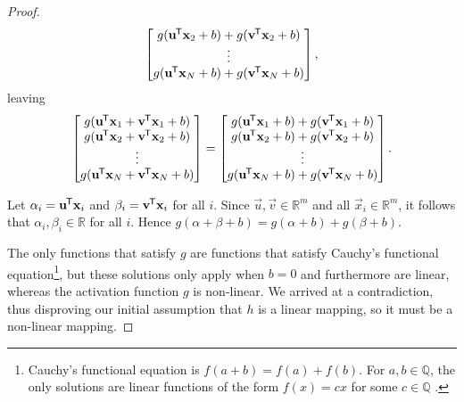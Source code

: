 \begin{proof}
\begin{equation*}
\begin{bmatrix}
            g(\mathbf{u}^{\mkern-1.5mu\mathsf{T}} \mathbf{x}_2 + b) + g(\mathbf{v}^{\mkern-1.5mu\mathsf{T}} \mathbf{x}_2 + b) \\
            \vdots \\
            g(\mathbf{u}^{\mkern-1.5mu\mathsf{T}} \mathbf{x}_N + b) + g(\mathbf{v}^{\mkern-1.5mu\mathsf{T}} \mathbf{x}_N + b) \\
        \end{bmatrix},
    \end{equation*}
    leaving
    \begin{equation*}
        \begin{bmatrix}
            g(\mathbf{u}^{\mkern-1.5mu\mathsf{T}} \mathbf{x}_1 + \mathbf{v}^{\mkern-1.5mu\mathsf{T}} \mathbf{x}_1 + b) \\
            g(\mathbf{u}^{\mkern-1.5mu\mathsf{T}} \mathbf{x}_2 + \mathbf{v}^{\mkern-1.5mu\mathsf{T}} \mathbf{x}_2 + b) \\
            \vdots \\
            g(\mathbf{u}^{\mkern-1.5mu\mathsf{T}} \mathbf{x}_N + \mathbf{v}^{\mkern-1.5mu\mathsf{T}} \mathbf{x}_N + b) \\
        \end{bmatrix}
        = \begin{bmatrix}
            g(\mathbf{u}^{\mkern-1.5mu\mathsf{T}} \mathbf{x}_1 + b) + g(\mathbf{v}^{\mkern-1.5mu\mathsf{T}} \mathbf{x}_1 + b) \\
            g(\mathbf{u}^{\mkern-1.5mu\mathsf{T}} \mathbf{x}_2 + b) + g(\mathbf{v}^{\mkern-1.5mu\mathsf{T}} \mathbf{x}_2 + b) \\
            \vdots \\
            g(\mathbf{u}^{\mkern-1.5mu\mathsf{T}} \mathbf{x}_N + b) + g(\mathbf{v}^{\mkern-1.5mu\mathsf{T}} \mathbf{x}_N + b) \\
        \end{bmatrix}.
    \end{equation*}

    Let $\alpha_i = \mathbf{u}^{\mkern-1.5mu\mathsf{T}} \mathbf{x}_i$ and $\beta_i = \mathbf{v}^{\mkern-1.5mu\mathsf{T}} \mathbf{x}_i$ for all $i$.
    Since $\vec{u},\vec{v} \in \mathbb{R}^m$ and all $\vec{x}_i \in \mathbb{R}^m$, it follows that $\alpha_i, \beta_i \in \mathbb{R}$ for all $i$.
    Hence $g(\alpha + \beta + b) = g(\alpha + b) + g(\beta + b)$.

    The only functions that satisfy $g$ are functions that satisfy Cauchy's functional equation\footnote{Cauchy's functional equation is $f(a+b)=f(a)+f(b)$. For $a,b \in \mathbb{Q}$, the only solutions are linear functions of the form $f(x) = cx$ for some $c \in \mathbb{Q}$ \cite{reem2017}.}, but these solutions only apply when $b=0$ and furthermore are linear, whereas the activation function $g$ is non-linear. 
    We arrived at a contradiction, thus disproving our initial assumption that $h$ is a linear mapping, so it must be a non-linear mapping.
\end{proof}

